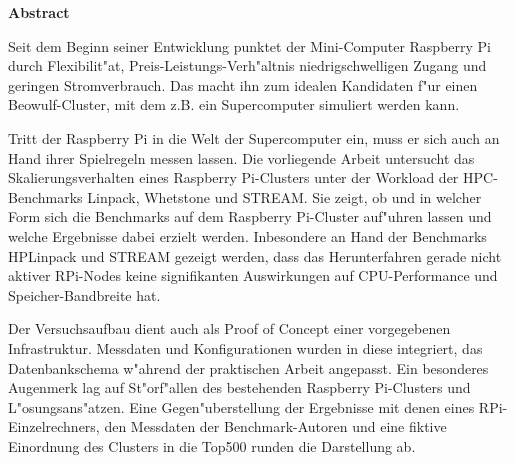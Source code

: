 \vspace*{2cm}

\begin{center}
    \textbf{Abstract}
\end{center}

\vspace*{1cm}

\noindent 
Seit dem Beginn seiner Entwicklung punktet der Mini-Computer Raspberry Pi durch Flexibilit"at, Preis-Leistungs-Verh"altnis niedrigschwelligen Zugang und geringen Stromverbrauch. Das macht ihn zum idealen Kandidaten f"ur einen Beowulf-Cluster, mit dem z.B. ein Supercomputer simuliert werden kann. 

Tritt der Raspberry Pi in die Welt der Supercomputer ein, muss er sich auch an Hand ihrer Spielregeln messen lassen. Die vorliegende Arbeit untersucht das Skalierungsverhalten eines Raspberry Pi-Clusters unter der Workload der HPC-Benchmarks Linpack, Whetstone und STREAM. Sie zeigt, ob und in welcher Form sich die Benchmarks auf dem Raspberry Pi-Cluster auf"uhren lassen und welche Ergebnisse dabei erzielt werden. Inbesondere an Hand der Benchmarks HPLinpack und STREAM gezeigt werden, dass das Herunterfahren gerade nicht aktiver RPi-Nodes keine signifikanten Auswirkungen auf CPU-Performance und Speicher-Bandbreite hat.

Der Versuchsaufbau dient auch als Proof of Concept einer vorgegebenen Infrastruktur. Messdaten und Konfigurationen wurden in diese integriert, das Datenbankschema w"ahrend der praktischen Arbeit angepasst. Ein besonderes Augenmerk lag auf St"orf"allen des bestehenden Raspberry Pi-Clusters und L"osungsans"atzen. Eine Gegen"uberstellung der Ergebnisse mit denen eines RPi-Einzelrechners, den Messdaten der Benchmark-Autoren und eine fiktive Einordnung des Clusters in die Top500 runden die Darstellung ab.  


